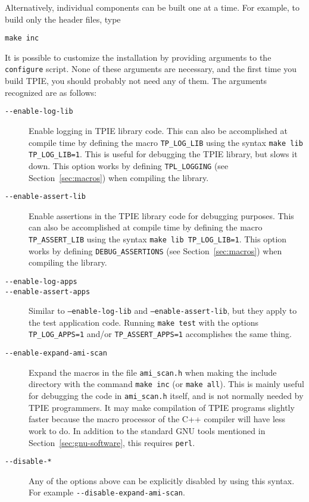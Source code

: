 Alternatively, individual components can be built one at a time.  For
example, to build only the header files, type 

\begin{verbatim}
make inc
\end{verbatim}

It is possible to customize the installation by providing arguments to
the {\tt configure} script. None of these
arguments are necessary, and the first time you build TPIE, you should
probably not need any of them.  The arguments recognized are as
follows:
\begin{description}
\item[\verb|--enable-log-lib|] 
  Enable logging in TPIE library code.
  This can also be accomplished at compile time by defining the macro
  \verb|TP_LOG_LIB| using the syntax \verb|make lib TP_LOG_LIB=1|.
  This is useful for debugging the TPIE library, but slows it down.
  This option works by defining \verb|TPL_LOGGING|
   (see Section~\ref{sec:macros})
  when compiling the library.
\item[\verb|--enable-assert-lib|]  
  Enable assertions in the TPIE library code for debugging purposes.
  This can also be accomplished at compile time by defining the macro
  \verb|TP_ASSERT_LIB| using the syntax \verb|make lib TP_LOG_LIB=1|.
  This option works by defining \verb|DEBUG_ASSERTIONS|
  (see Section~\ref{sec:macros})
  when compiling the library.
\item[\verb|--enable-log-apps|] 
\item[\verb|--enable-assert-apps|]  
  Similar to {\tt --enable-log-lib} and {\tt --enable-assert-lib}, but
  they apply to the test application code.  Running \verb|make test|
  with the options \verb|TP_LOG_APPS=1| and/or \verb|TP_ASSERT_APPS=1|
  accomplishes the same thing.
\item[\verb|--enable-expand-ami-scan|]  Expand the macros in the file
  \verb|ami_scan.h| when making the include directory with the
command {\tt make inc} (or {\tt make all}).  This is mainly useful for
debugging the code in \verb|ami_scan.h| itself, and is not normally
needed by TPIE programmers.  It may make compilation of TPIE programs
slightly faster because the macro processor of the C++ compiler will
have less work to do.  In addition to the standard GNU tools mentioned
in Section~\ref{sec:gnu-software}, this requires \verb|perl|.
\item[\verb|--disable-*|]  Any of the options above can be explicitly
  disabled  by using this syntax.  For example
  \verb|--disable-expand-ami-scan|. 
\end{description}


